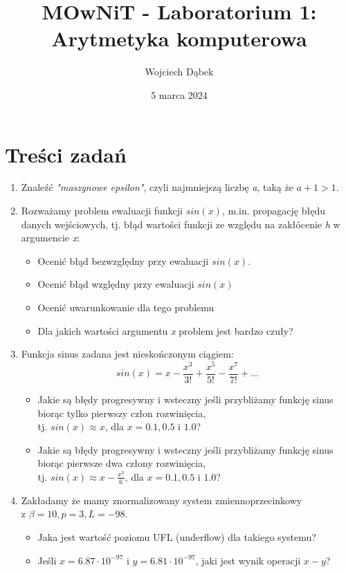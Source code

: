 \documentclass{article}
\title{MOwNiT - Laboratorium 1: \\
Arytmetyka komputerowa}
\author{Wojciech Dąbek}
\date{5 marca 2024}
\begin{document}
\maketitle

\section{Treści zadań}

\begin{enumerate}
    \item Znaleźć \textit{"maszynowe epsilon"}, czyli najmniejszą liczbę \textit{a}, taką że \(a+1>1\).
    \item Rozważamy problem ewaluacji funkcji \(sin(x)\), m.in. propagację błędu danych wejściowych, tj. błąd wartości funkcji ze względu na zakłócenie \textit{h} w argumencie \textit{x}:
    \begin{itemize}
        \item Ocenić błąd bezwzględny przy ewaluacji \(sin(x)\).
        \item Ocenić błąd względny przy ewaluacji \(sin(x)\)
        \item Ocenić uwarunkowanie dla tego problemu
        \item Dla jakich wartości argumentu \textit{x} problem jest bardzo czuły?
    \end{itemize}
    \item Funkcja sinus zadana jest nieskończonym ciągiem:
    \[sin(x) = x - \frac{x^3}{3!} + \frac{x^5}{5!} - \frac{x^7}{7!} + \ldots\]
    \begin{itemize}
        \item Jakie są błędy progresywny i wsteczny jeśli przybliżamy funkcję sinus biorąc tylko pierwszy człon rozwinięcia,\\
        tj. \(sin(x) \approx x\), dla \(x = 0.1, 0.5\) i \(1.0\)?
        \item Jakie są błędy progresywny i wsteczny jeśli przybliżamy funkcję sinus biorąc pierwsze dwa człony rozwinięcia,\\
        tj. \(sin(x) \approx x - \frac{x^3}{6}\), dla \(x = 0.1, 0.5\) i \(1.0\)?
    \end{itemize}
    \item Zakładamy że mamy znormalizowany system zmiennoprzecinkowy\\
    z \(\beta = 10, p = 3, L = -98\).
    \begin{itemize}
        \item Jaka jest wartość poziomu UFL (underflow) dla takiego systemu?
        \item Jeśli \(x = 6.87 \cdot 10^{-97}\) i \(y = 6.81 \cdot 10^{-97}\), jaki jest wynik operacji \(x - y\)?
    \end{itemize}
\end{enumerate}
\end{document}
